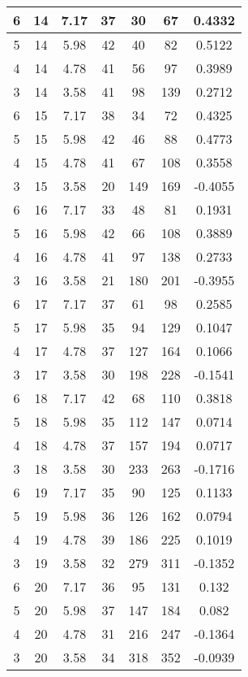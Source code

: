 \documentclass[letterpaper, 12pt]{article}
\begin{document}
\begin{longtable}{|c|c|c|c|c|c|c|}
\hline
6 & 14 & 7.17 & 37 & 30 & 67 & 0.4332 \\
\hline
5 & 14 & 5.98 & 42 & 40 & 82 & 0.5122 \\
\hline
4 & 14 & 4.78 & 41 & 56 & 97 & 0.3989 \\
\hline
3 & 14 & 3.58 & 41 & 98 & 139 & 0.2712 \\
\hline
6 & 15 & 7.17 & 38 & 34 & 72 & 0.4325 \\
\hline
5 & 15 & 5.98 & 42 & 46 & 88 & 0.4773 \\
\hline
4 & 15 & 4.78 & 41 & 67 & 108 & 0.3558 \\
\hline
3 & 15 & 3.58 & 20 & 149 & 169 & -0.4055 \\
\hline
6 & 16 & 7.17 & 33 & 48 & 81 & 0.1931 \\
\hline
5 & 16 & 5.98 & 42 & 66 & 108 & 0.3889 \\
\hline
4 & 16 & 4.78 & 41 & 97 & 138 & 0.2733 \\
\hline
3 & 16 & 3.58 & 21 & 180 & 201 & -0.3955 \\
\hline
6 & 17 & 7.17 & 37 & 61 & 98 & 0.2585 \\
\hline
5 & 17 & 5.98 & 35 & 94 & 129 & 0.1047 \\
\hline
4 & 17 & 4.78 & 37 & 127 & 164 & 0.1066 \\
\hline
3 & 17 & 3.58 & 30 & 198 & 228 & -0.1541 \\
\hline
6 & 18 & 7.17 & 42 & 68 & 110 & 0.3818 \\
\hline
5 & 18 & 5.98 & 35 & 112 & 147 & 0.0714 \\
\hline
4 & 18 & 4.78 & 37 & 157 & 194 & 0.0717 \\
\hline
3 & 18 & 3.58 & 30 & 233 & 263 & -0.1716 \\
\hline
6 & 19 & 7.17 & 35 & 90 & 125 & 0.1133 \\
\hline
5 & 19 & 5.98 & 36 & 126 & 162 & 0.0794 \\
\hline
4 & 19 & 4.78 & 39 & 186 & 225 & 0.1019 \\
\hline
3 & 19 & 3.58 & 32 & 279 & 311 & -0.1352 \\
\hline
6 & 20 & 7.17 & 36 & 95 & 131 & 0.132 \\
\hline
5 & 20 & 5.98 & 37 & 147 & 184 & 0.082 \\
\hline
4 & 20 & 4.78 & 31 & 216 & 247 & -0.1364 \\
\hline
3 & 20 & 3.58 & 34 & 318 & 352 & -0.0939 \\
\hline
\end{longtable}
\end{document}
